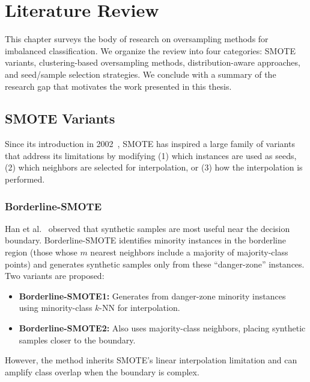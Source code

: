 
\chapter{Literature Review}
\label{ch:literature}

This chapter surveys the body of research on oversampling methods for imbalanced classification.
We organize the review into four categories: SMOTE variants, clustering-based oversampling methods, distribution-aware approaches, and seed/sample selection strategies.
We conclude with a summary of the research gap that motivates the work presented in this thesis.


\section{SMOTE Variants}
\label{sec:lit:smote_variants}

Since its introduction in 2002~\cite{chawla2002smote}, SMOTE has inspired a large family of variants that address its limitations by modifying (1) which instances are used as seeds, (2) which neighbors are selected for interpolation, or (3) how the interpolation is performed.

\subsection{Borderline-SMOTE}
\label{sec:lit:borderline}

Han et al.~\cite{han2005borderline} observed that synthetic samples are most useful near the decision boundary.
Borderline-SMOTE identifies minority instances in the borderline region (those whose $m$ nearest neighbors include a majority of majority-class points) and generates synthetic samples only from these ``danger-zone'' instances.
Two variants are proposed:
\begin{itemize}[leftmargin=*]
  \item \textbf{Borderline-SMOTE1:} Generates from danger-zone minority instances using minority-class $k$-NN for interpolation.
  \item \textbf{Borderline-SMOTE2:} Also uses majority-class neighbors, placing synthetic samples closer to the boundary.
\end{itemize}
However, the method inherits SMOTE's linear interpolation limitation and can amplify class overlap when the boundary is complex.


